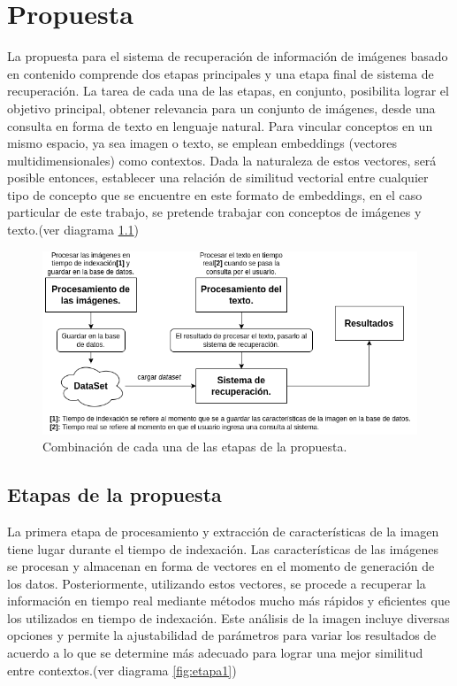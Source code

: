 \chapter{Propuesta}\label{chapter:proposal}
La propuesta para el sistema de recuperación de información de imágenes basado en contenido comprende dos etapas principales y una etapa final de sistema de recuperaci\'on. La tarea de cada una de las etapas, en conjunto, posibilita lograr el objetivo principal, obtener relevancia para un conjunto de im\'agenes, desde una consulta en forma de texto en lenguaje natural. Para vincular conceptos en un mismo espacio, ya sea imagen o texto, se emplean embeddings (vectores multidimensionales) como contextos. Dada la naturaleza de estos vectores, ser\'a posible entonces, establecer una relaci\'on de similitud vectorial entre cualquier tipo de concepto que se encuentre en este formato de embeddings, en el caso particular de este trabajo, se pretende trabajar con conceptos de im\'agenes y texto.(ver diagrama \ref{fig:etapas})

\begin{figure}[H]
    \centering
\includegraphics[height=0.25\textheight]{Graphics/Todas.drawio.png}
    \caption{Combinaci\'on de cada una de las etapas de la propuesta.}
    \label{fig:etapas}
\end{figure}    

\section{Etapas de la propuesta}

La primera etapa de procesamiento y extracción de características de la imagen tiene lugar durante el tiempo de indexación. Las características de las imágenes se procesan y almacenan en forma de vectores en el momento de generación de los datos. Posteriormente, utilizando estos vectores, se procede a recuperar la información en tiempo real mediante métodos mucho más rápidos y eficientes que los utilizados en tiempo de indexación. Este análisis de la imagen incluye diversas opciones y permite la ajustabilidad de parámetros para variar los resultados de acuerdo a lo que se determine más adecuado para lograr una mejor similitud entre contextos.(ver diagrama \ref{fig:etapa1})

